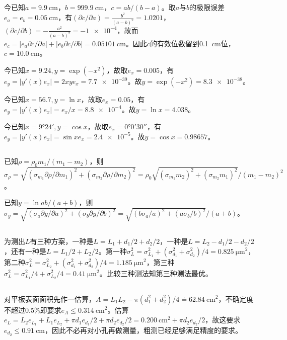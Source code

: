 \documentclass[UTF8]{ctexart}
\begin{document}
\subsection{}
今已知$a=\SI{9.9}{\cm}$，$b=\SI{999.9}{\cm}$，$c=ab/(b-a)$。取$a$与$b$的极限误差$e_a=e_b=\SI{0.05}{\cm}$，有$(\partial c/\partial a)=\frac{b^2}{(a-b)^2}=1.0201$，$(\partial c/\partial b)=-\frac{a^2}{(a-b)^2}=\num{-1e-4}$，故而$e_c=\lvert e_a\partial c/\partial a\rvert+\lvert e_b\partial c/\partial b\rvert=\SI{0.05101}{\cm}$。因此$c$的有效位数留到\SI{0.1}{\cm}位，$c=\SI{10.0}{\cm}$。

今已知$x=9.24, y=\exp{(-x^2)}$，故取$e_x=0.005$，有 $e_y=\lvert y'(x)e_x\rvert=2xye_x=\num{7.7e-39}$。故$y=\exp{(-x^2)}=\num{8.3e-38}$。

今已知$x=56.7, y=\ln{x}$，故取$e_x=0.05$，有 $e_y=\lvert y'(x)e_x\rvert=e_x/x=\num{8.8e-4}$。故$y=\ln{x}=\num{4.038}$。

今已知$x=\ang{9;24;}, y=\cos{x}$，故取$e_x=\ang{0;0;30}$，有 $e_y=\lvert y'(x)e_x\rvert=\sin{x}e_x=\num{2.4e-5}$。故$y=\cos{x}=\num{0.98657}$。
\subsection{}
已知$\rho=\rho_0m_1/(m_1-m_2)$，则$\sigma_{\rho}=\sqrt{(\sigma_{m_1}\partial\rho/\partial m_1)^2+(\sigma_{m_2}\partial\rho/\partial m_2)^2}=\rho_0\sqrt{(\sigma_{m_1}m_2)^2+(\sigma_{m_2}m_1)^2}/(m_1-m_2)^2$。

已知$y=\ln{ab/(a+b)}$，则$\sigma_y=\sqrt{(\sigma_{a}\partial y/\partial a)^2+(\sigma_b\partial y/\partial b)^2}=\sqrt{(b\sigma_a/a)^2+(a\sigma_b/b)^2}/(a+b)$。
\subsection{}
为测出$L$有三种方案，一种是$L=L_1+d_1/2+d_2/2$，一种是$L=L_2-d_1/2-d_2/2$，还有一种是$L=L_1/2+L_2/2$。第一种$\sigma_L^2=\sigma_{L_1}^2+(\sigma_{d_1}^2+\sigma_{d_2}^2)/4=\SI{0.825}{\micro\meter\squared}$，第二种$\sigma_L^2=\sigma_ {L_2}^2+(\sigma_{d_1}^2+\sigma_{d_2}^2)/4=\SI{1.185}{\micro\meter\squared}$，第三种$\sigma_L^2=\sigma_{L_1}^2/4+\sigma_{L_2}^2/4=\SI{0.41}{\micro\meter\squared}$。比较三种测法知第三种测法最优。
\subsection{}
对平板表面面积先作一估算，$A=L_1L_2-\pi(d_1^2+d_2^2)/4\doteq\SI{62.84}{\cm\squared}$，不确定度不超过0.5\%即要求$e_A\leq\SI{0.314}{\cm\squared}$。估算$e_L=L_2e_{L_1}+L_1e_{L_2}+\pi d_1e_{d_1}/2+\pi d_2e_{d_2}/2=\SI{0.200}{\cm\squared}+\pi d_2e_{d_2}/2$，故这要求$e_{d_2}\leq\SI{0.91}{\cm}$，因此不必再对小孔再做测量，粗测已经足够满足精度的要求。
\end{document}
